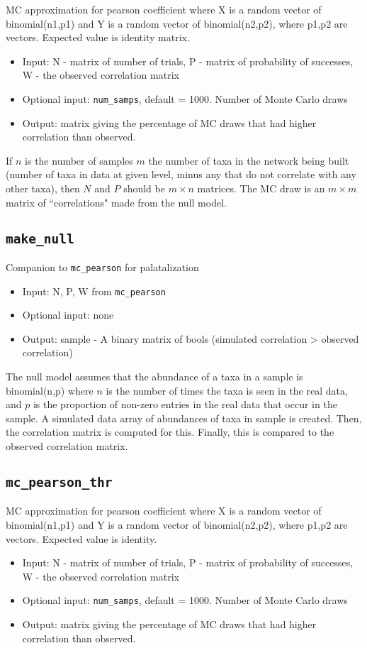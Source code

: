 \documentclass[10pt]{article}
\theoremstyle{definition}
\numberwithin{theorem}{section}
\numberwithin{definition}{section}
\numberwithin{lemma}{section}
\numberwithin{corollary}{section}
\numberwithin{clm}{section}
\numberwithin{rmk}{section}
\begin{document}
MC approximation for pearson coefficient where X is a random vector of binomial(n1,p1)
and Y is a random vector of binomial(n2,p2), where p1,p2 are vectors. Expected value is identity matrix.

\begin{itemize}
	\item Input: N - matrix of number of trials, P - matrix of probability of successes, W - the observed correlation matrix
	\item Optional input: \verb|num_samps|, default = 1000. Number of Monte Carlo draws
	\item Output: matrix giving the percentage of MC draws that had higher correlation than observed.
\end{itemize}

If $n$ is the number of samples $m$ the number of taxa in the network being built (number of taxa in data at given level, minus any that do not correlate with any other taxa), then $N$ and $P$ should be $m\times n$ matrices. The MC draw is an $m\times m$ matrix of ``correlations" made from the null model.

\cprotect \subsection{\verb|make_null|}

Companion to \verb|mc_pearson| for palatalization

\begin{itemize}
	\item Input: N, P, W from \verb|mc_pearson|
	\item Optional input: none
	\item Output: sample - A binary matrix of bools (simulated correlation > observed correlation)
\end{itemize}

The null model assumes that the abundance of a taxa in a sample is binomial(n,p) where $n$ is the number of times the taxa is seen in the real data, and $p$ is the proportion of non-zero entries in the real data that occur in the sample. A simulated data array of abundances of taxa in sample is created. Then, the correlation matrix is computed for this. Finally, this is compared to the observed correlation matrix.

\cprotect \subsection{\verb|mc_pearson_thr|}
MC approximation for pearson coefficient where X is a random vector of binomial(n1,p1)
and Y is a random vector of binomial(n2,p2), where p1,p2 are vectors. Expected value is identity.
\begin{itemize}
	\item Input: N - matrix of number of trials, P - matrix of probability of successes, W - the observed correlation matrix
	\item Optional input: \verb|num_samps|, default = 1000. Number of Monte Carlo draws
	\item Output: matrix giving the percentage of MC draws that had higher correlation than observed.
\end{itemize}
\end{document}
